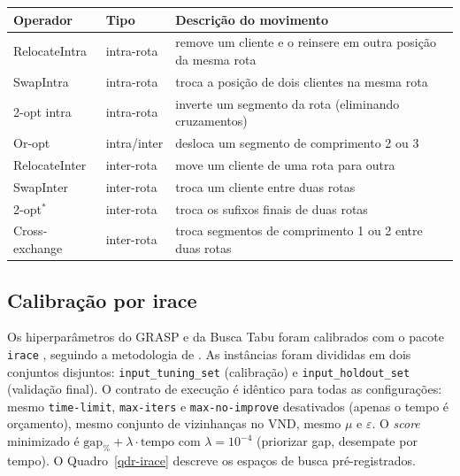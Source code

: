 \documentclass[10pt, a4paper]{article}
\begin{document}
\begin{quadro}[H]
\centering
\caption{Operadores de vizinhan\c{c}a avaliados}
\label{qdr-operadores}
\small
\begin{tabular}{|l|l|p{75mm}|}
\hline
\rowcolor{gray!20}\textbf{Operador} & \textbf{Tipo} & \textbf{Descri\c{c}\~ao do movimento} \\
\hline
RelocateIntra & intra-rota & remove um cliente e o reinsere em outra posi\c{c}\~ao da mesma rota \\
SwapIntra & intra-rota & troca a posi\c{c}\~ao de dois clientes na mesma rota \\
2-opt intra & intra-rota & inverte um segmento da rota (eliminando cruzamentos) \\
Or-opt & intra/inter & desloca um segmento de comprimento 2 ou 3 \\
RelocateInter & inter-rota & move um cliente de uma rota para outra \\
SwapInter & inter-rota & troca um cliente entre duas rotas \\
2-opt$^*$ & inter-rota & troca os sufixos finais de duas rotas \\
Cross-exchange & inter-rota & troca segmentos de comprimento 1 ou 2 entre duas rotas \\
\hline
\end{tabular}
\end{quadro}

\subsection{Calibra\c{c}\~ao por irace}
\label{sec-irace}

Os hiperpar\^ametros do GRASP e da Busca Tabu foram calibrados com o pacote \texttt{irace} \citep{lopez2016}, seguindo a metodologia de \citet{birattari2009}. As inst\^ancias foram divididas em dois conjuntos disjuntos: \texttt{input\_tuning\_set} (calibra\c{c}\~ao) e \texttt{input\_holdout\_set} (valida\c{c}\~ao final). O contrato de execu\c{c}\~ao \'e id\^entico para todas as configura\c{c}\~oes: mesmo \texttt{time-limit}, \texttt{max-iters} e \texttt{max-no-improve} desativados (apenas o tempo \'e or\c{c}amento), mesmo conjunto de vizinhan\c{c}as no VND, mesmo $\mu$ e $\varepsilon$. O \emph{score} minimizado \'e $\text{gap}_\% + \lambda \cdot \text{tempo}$ com $\lambda = 10^{-4}$ (priorizar gap, desempate por tempo). O Quadro~\ref{qdr-irace} descreve os espa\c{c}os de busca pr\'e-registrados.
\end{document}
